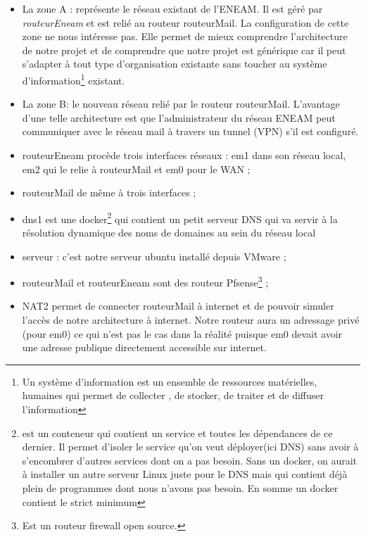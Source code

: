 \documentclass[a4paper,12pt,french]{report} %
\begin{document}
\begin{itemize}
\item La zone A : représente le réseau existant de l'ENEAM. Il est géré par \emph{routeurEneam} et est relié au routeur routeurMail. La configuration de cette zone ne nous intéresse pas. Elle permet de mieux comprendre l'architecture de notre projet et de comprendre que notre projet est générique car il peut s'adapter à tout type d'organisation existante sans toucher au système d'information\footnote{ Un système d'information est un ensemble de ressources matérielles, humaines qui permet de collecter , de stocker, de traiter et de diffuser l'information} existant.
\item La zone B: le nouveau réseau relié par le routeur routeurMail.
L'avantage d'une telle architecture est que l'administrateur du réseau ENEAM peut communiquer avec le réseau mail à travers un tunnel (VPN) s'il est configuré.
\item routeurEneam procède trois interfaces réseaux : em1 dans son réseau local, em2 qui le relie à routeurMail et em0 pour le WAN ;
\item routeurMail de même à trois interfaces ;
\item dns1 est une docker\footnote{est un conteneur qui contient un service et toutes les dépendances de ce dernier. Il permet d'isoler le service qu'on veut déployer(ici DNS) sans avoir à s'encombrer d'autres services dont on a pas besoin. Sans un docker, on aurait à installer un autre serveur Linux juste pour le DNS mais qui contient déjà plein de programmes dont nous n'avons  pas besoin. En somme un docker contient le strict minimum} qui contient un petit serveur DNS qui va servir à la résolution dynamique des noms de domaines au sein du réseau local 
\item serveur : c'est notre serveur ubuntu installé depuis VMware ;
\item  routeurMail et routeurEneam sont des routeur Pfsense\footnote{Est un routeur firewall open source.} ;
\item NAT2 permet de connecter routeurMail à internet et de pouvoir simuler l'accès de notre architecture à internet. Notre routeur aura un adressage privé (pour em0) ce qui n'est pas le cas dans la réalité puisque em0 devait avoir une adresse publique directement accessible sur internet.
\end{itemize}
\end{document}
